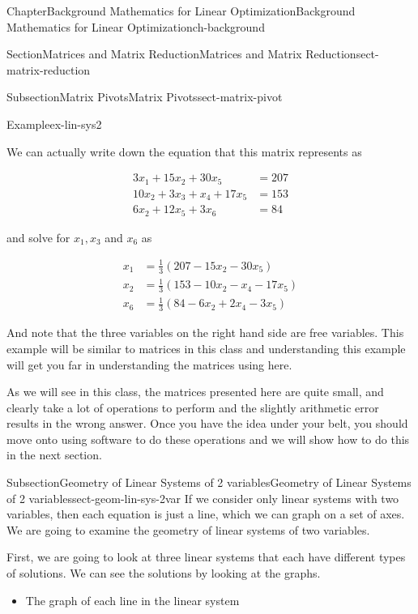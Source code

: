 \documentclass[oneside,10pt,]{book}
\numberwithin{equation}{section}
\newcommand{\amp}{&}
\begin{document}
\begin{chapterptx}{Chapter}{Background Mathematics for Linear Optimization}{}{Background Mathematics for Linear Optimization}{}{}{ch-background}
\begin{sectionptx}{Section}{Matrices and Matrix Reduction}{}{Matrices and Matrix Reduction}{}{}{sect-matrix-reduction}
\begin{subsectionptx}{Subsection}{Matrix Pivots}{}{Matrix Pivots}{}{}{sect-matrix-pivot}
\begin{example}{Example}{}{ex-lin-sys2}
%
\par
We can actually write down the equation that this matrix represents as%
\par
%
\begin{align*}
3 x_1 + 15 x_2 + 30 x_5 \amp = 207\\
10x_2 + 3x_3 + x_4 + 17x_5 \amp = 153 \\
6 x_2 + 12x_5 + 3x_6 \amp = 84
\end{align*}
%
\par
and solve for \(x_1, x_3\) and \(x_6\) as%
\par
%
\begin{align*}
x_1 \amp = \frac{1}{3}(207 -15 x_2  - 30 x_5)\\
x_2 \amp = \frac{1}{3}(153 -10x_2 - x_4 - 17 x_5) \\
x_6 \amp = \frac{1}{3}(84 - 6x_2 +2x_4-3x_5)
\end{align*}
%
\par
And note that the three variables on the right hand side are free variables. This example will be similar to matrices in this class and understanding this example will get you far in understanding the matrices using here.%
\end{example}
As we will see in this class, the matrices presented here are quite small, and clearly take a lot of operations to perform and the slightly arithmetic error results in the wrong answer. Once you have the idea under your belt, you should move onto using software to do these operations and we will show how to do this in the next section.%
\end{subsectionptx}
%
%
\typeout{************************************************}
\typeout{************************************************}
%
\begin{subsectionptx}{Subsection}{Geometry of Linear Systems of 2 variables}{}{Geometry of Linear Systems of 2 variables}{}{}{sect-geom-lin-sys-2var}
If we consider only linear systems with two variables, then each equation is just a line, which we can graph on a set of axes. We are going to examine the geometry of linear systems of two variables.%
\par
First, we are going to look at three linear systems that each have different types of solutions. We can see the solutions by looking at the graphs.%
\par
%
\begin{itemize}[label=\textbullet]
\item{}The graph of each line in the linear system%

\end{itemize}
\end{subsectionptx}
\end{sectionptx}
\end{chapterptx}
\end{document}
